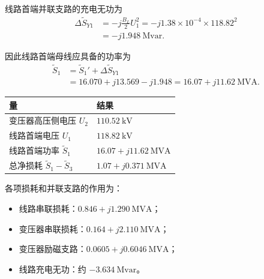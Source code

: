\begin{enumerate}
\begin{solution}

              线路首端并联支路的充电无功为
              \begin{align*}
                  \Delta \tilde S_{Y1}
                   & =-j\frac{B_L}{2}U_1^2
                  =-j1.38\times10^{-4}\times118.82^2                      \\
                   & =\boxed{-j1.948\ \mathrm{Mvar}}.
              \end{align*}

              因此线路首端母线应具备的功率为
              \begin{align*}
                  \tilde S_1
                   & =\tilde S_1'+\Delta \tilde S_{Y1}                       \\
                   & =16.070+j13.569-j1.948
                  =\boxed{16.07+j11.62\ \mathrm{MVA}}.
              \end{align*}


              \begin{center}
                  \begin{tabular}{ll}
                      \toprule
                      量                                 & 结果                                       \\
                      \midrule
                      变压器高压侧电压 \(U_2\)           & \(110.52\ \mathrm{kV}\)                    \\
                      线路首端电压 \(U_1\)               & \(118.82\ \mathrm{kV}\)                    \\
                      线路首端功率 \(\tilde S_1\)        & \(16.07+j11.62\ \mathrm{MVA}\)             \\
                      总净损耗 \(\tilde S_1-\tilde S_3\)  & \(1.07+j0.371\ \mathrm{MVA}\)              \\
                      \bottomrule
                  \end{tabular}
              \end{center}

              各项损耗和并联支路的作用为：
              \begin{itemize}[leftmargin=1.8em,itemsep=0.1em,topsep=0.2em]
                  \item 线路串联损耗：\(0.846+j1.290\ \mathrm{MVA}\)；
                  \item 变压器串联损耗：\(0.164+j2.110\ \mathrm{MVA}\)；
                  \item 变压器励磁支路：\(0.0605+j0.6046\ \mathrm{MVA}\)；
                  \item 线路充电无功：约 \(-3.634\ \mathrm{Mvar}\)。
              \end{itemize}


\end{solution}
\end{enumerate}
